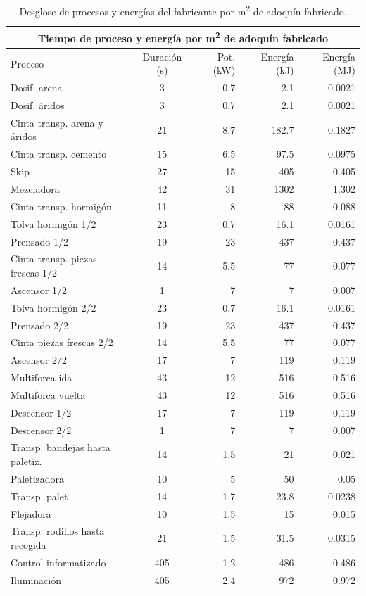 \begin{table}[!htb]
\centering
\begin{tabular}{lcrrr}
\toprule
\multicolumn{5}{c}{Tiempo de proceso y energía por \si{m^2} de adoquín fabricado}\\
\midrule
Proceso & Duración (\si{s}) & Pot. (\si{kW}) & Energía (\si{kJ}) & Energía (\si{MJ})\\
\midrule
Dosif. arena & 3 & 0.7 & 2.1 & 0.0021\\
Dosif. áridos & 3 & 0.7 & 2.1 & 0.0021\\
Cinta transp. arena y áridos  & 21 & 8.7 & 182.7 & 0.1827\\
Cinta transp. cemento & 15 & 6.5 & 97.5 & 0.0975\\
Skip  & 27 & 15 & 405 & 0.405\\
Mezcladora & 42 & 31 & 1302 & 1.302\\
Cinta transp. hormigón & 11 & 8 & 88 & 0.088\\
Tolva hormigón 1/2 & 23 & 0.7 & 16.1 & 0.0161\\
Prensado 1/2 & 19 & 23 & 437 & 0.437\\
Cinta transp. piezas frescas 1/2 & 14 & 5.5 & 77 & 0.077\\
Ascensor 1/2 & 1 & 7 & 7 & 0.007\\
Tolva hormigón 2/2 & 23 & 0.7 & 16.1 & 0.0161\\
Prensado 2/2 & 19 & 23 & 437 & 0.437\\
Cinta piezas frescas 2/2 & 14 & 5.5 & 77 & 0.077\\
Ascensor 2/2 & 17 & 7 & 119 & 0.119\\
Multiforca ida & 43 & 12 & 516 & 0.516\\
Multiforca vuelta & 43 & 12 & 516 & 0.516\\
Descensor 1/2 & 17 & 7 & 119 & 0.119\\
Descensor 2/2 & 1 & 7 & 7 & 0.007\\
Transp. bandejas hasta paletiz. & 14 & 1.5 & 21 & 0.021\\
Paletizadora & 10 & 5 & 50 & 0.05\\
Transp. palet & 14 & 1.7 & 23.8 & 0.0238\\
Flejadora & 10 & 1.5 & 15 & 0.015\\
Transp. rodillos hasta recogida  & 21 & 1.5 & 31.5 & 0.0315\\
Control informatizado & 405 & 1.2 & 486 & 0.486\\
Iluminación & 405 & 2.4 & 972 & 0.972\\
\bottomrule
\end{tabular}
\caption{Desglose de procesos y energías del fabricante por \si{m^2} de adoquín fabricado.}
\label{desgloseenergia}
\end{table}

